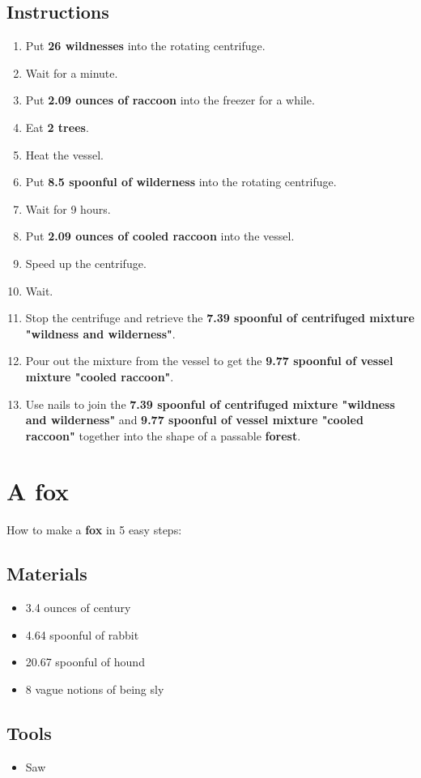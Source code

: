 \documentclass{article}
\begin{document}
\subsection{Instructions}\begin{enumerate}
\item 
Put \textbf{26 wildnesses} into the rotating centrifuge.
\item 
Wait for a minute.
\item 
Put \textbf{2.09 ounces of raccoon} into the freezer for a while.
\item 
Eat \textbf{2 trees}.
\item 
Heat the vessel.
\item 
Put \textbf{8.5 spoonful of wilderness} into the rotating centrifuge.
\item 
Wait for 9 hours.
\item 
Put \textbf{2.09 ounces of cooled raccoon} into the vessel.
\item 
Speed up the centrifuge.
\item 
Wait.
\item 
Stop the centrifuge and retrieve the \textbf{7.39 spoonful of centrifuged mixture "wildness and wilderness"}.
\item 
Pour out the mixture from the vessel to get the \textbf{9.77 spoonful of vessel mixture "cooled raccoon"}.
\item 
Use nails to join the \textbf{7.39 spoonful of centrifuged mixture "wildness and wilderness"} and \textbf{9.77 spoonful of vessel mixture "cooled raccoon"} together into the shape of a passable \textbf{forest}.
\end{enumerate}
\newpage
\section{A fox}How to make a \textbf{fox} in 5 easy steps:

\subsection{Materials}\begin{itemize}
\item 
3.4 ounces of century
\item 
4.64 spoonful of rabbit
\item 
20.67 spoonful of hound
\item 
8 vague notions of being sly
\end{itemize}
\subsection{Tools}\begin{itemize}
\item 
Saw
\end{itemize}
\end{document}
